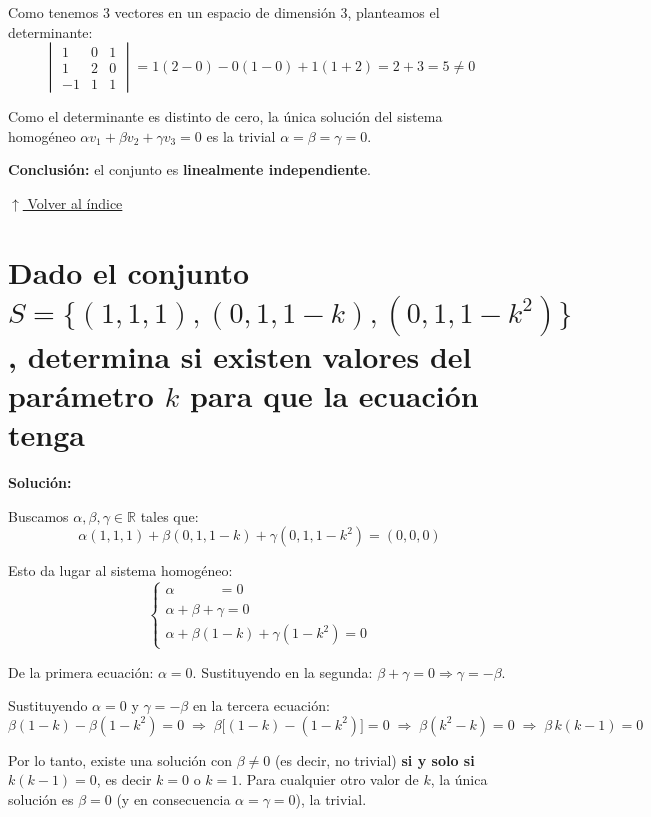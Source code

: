 \documentclass[12pt]{article}
\newcommand{\solucion}{%
    \vspace{0.8em}%
    \textbf{Solución:}%
    \vspace{0.8em}%
}
\newcommand{\volverindice}{%
    \vspace{1em}%
    \begin{flushright}%
        \hyperlink{indice}{\small $\uparrow$ Volver al índice}%
    \end{flushright}%
}
\begin{document}
\begin{enumerate}[label=\alph*.-]
    Como tenemos 3 vectores en un espacio de dimensión 3, planteamos el determinante:
    \[
    \begin{vmatrix} 1 & 0 & 1 \\ 1 & 2 & 0 \\ -1 & 1 & 1 \end{vmatrix}
    = 1(2-0) - 0(1-0) + 1(1+2) = 2 + 3 = 5 \neq 0
    \]

    Como el determinante es distinto de cero, la única solución del sistema homogéneo $\alpha v_1+\beta v_2+\gamma v_3=0$ es la trivial $\alpha=\beta=\gamma=0$.

    \textbf{Conclusión:} el conjunto es \textbf{linealmente independiente}.
\end{enumerate}

\volverindice
\newpage

\section{Dado el conjunto $S = \{(1,1,1),(0,1,1-k),(0,1,1-k^2)\}$, determina si existen valores del parámetro $k$ para que la ecuación tenga}

\solucion

Buscamos $\alpha,\beta,\gamma \in \mathbb{R}$ tales que:
\[
\alpha(1,1,1) + \beta(0,1,1-k) + \gamma(0,1,1-k^2) = (0,0,0)
\]

Esto da lugar al sistema homogéneo:
\[
\begin{cases}
\alpha \phantom{+\beta+\gamma} = 0 \\
\alpha+\beta+\gamma = 0 \\
\alpha+\beta(1-k)+\gamma(1-k^2) = 0
\end{cases}
\]

De la primera ecuación: $\alpha=0$. Sustituyendo en la segunda: $\beta+\gamma=0 \Rightarrow \gamma=-\beta$.

Sustituyendo $\alpha=0$ y $\gamma=-\beta$ en la tercera ecuación:
\[
\beta(1-k) - \beta(1-k^2) = 0 \;\Longrightarrow\; \beta\big[(1-k)-(1-k^2)\big] = 0 \;\Longrightarrow\; \beta(k^2-k) = 0 \;\Longrightarrow\; \beta\, k(k-1) = 0
\]

Por lo tanto, existe una solución con $\beta\neq0$ (es decir, no trivial) \textbf{si y solo si} $k(k-1)=0$, es decir $k=0$ o $k=1$. Para cualquier otro valor de $k$, la única solución es $\beta=0$ (y en consecuencia $\alpha=\gamma=0$), la trivial.
\end{document}
